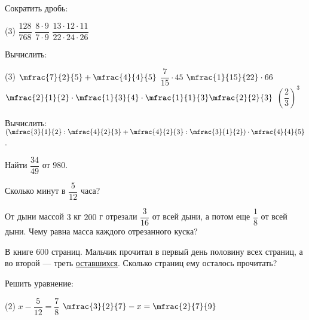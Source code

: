 %
%
\begin{class}[number=3]
	\begin{listofex}
		\item Сократить дробь:
		\begin{tasks}(3)
			\task \( \dfrac{128}{768} \)
			\task \( \dfrac{8\cdot9}{7\cdot9} \)
			\task \( \dfrac{13\cdot12\cdot11}{22\cdot24\cdot26} \)
		\end{tasks}
		\item Вычислить:
		\begin{tasks}(3)
			\task \( \mfrac{7}{2}{5}+\mfrac{4}{4}{5} \)
			\task \( \dfrac{7}{15}\cdot45 \)
			\task \( \mfrac{1}{15}{22}\cdot66 \)
			\task \( \mfrac{2}{1}{2}\cdot\mfrac{1}{3}{4}\cdot\mfrac{1}{1}{3}\mfrac{2}{2}{3} \)
			\task \( \left( \dfrac{2}{3} \right)^3 \)
		\end{tasks}
		\item Вычислить:\quad\( \left( \mfrac{3}{1}{2}:\mfrac{4}{2}{3}+\mfrac{4}{2}{3}:\mfrac{3}{1}{2} \right)\cdot\mfrac{4}{4}{5} \).
		\item Найти \( \dfrac{34}{49} \) от \( 980 \).
		\item Сколько минут в \( \dfrac{5}{12} \) часа?
		\item От дыни массой \( 3 \) кг \( 200 \) г отрезали \( \dfrac{3}{16} \) от всей дыни, а потом еще \( \dfrac{1}{8} \) от всей дыни. Чему равна масса
		каждого отрезанного куска?
		\item В книге \( 600 \) страниц. Мальчик прочитал в первый день половину всех страниц, а во второй --- треть \underline{оставшихся}. Сколько страниц ему осталось прочитать?
		\item Решить уравнение:
		\begin{tasks}(2)
			\task \( x-\dfrac{5}{12}=\dfrac{7}{8} \)
			\task \( \mfrac{3}{2}{7}-x=\mfrac{2}{7}{9} \)
		\end{tasks}
	\end{listofex}
\end{class}
%
